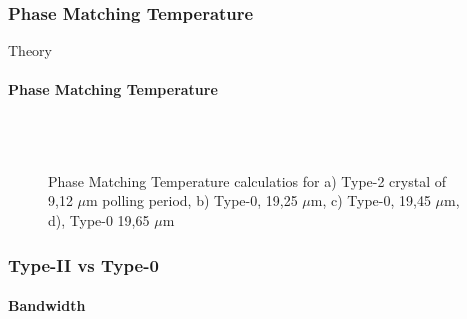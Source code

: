 \documentclass[serif,8pt]{beamer}
\begin{document}
{{\subsubsection{Phase Matching Temperature}
\begin{frame}{Theory}
	\framesubtitle{Phase Matching Temperature}
	\begin{figure}[!ht]
	  \centering
	  \caption{Phase Matching Temperature calculatios for a) Type-2 crystal of 9,12 $\mu$m polling period, b) Type-0, 19,25 $\mu$m, c) Type-0, 19,45 $\mu$m, d), Type-0 19,65 $\mu$m}
	  \quad
	  \\
	  \quad
	  \\
	  \label{fig:gratingstheory}
	\end{figure}
\end{frame}

\begin{frame}[t]
	\frametitle{Type-II vs Type-0}
	\framesubtitle{Bandwidth}


\end{frame}}}
\end{document}
